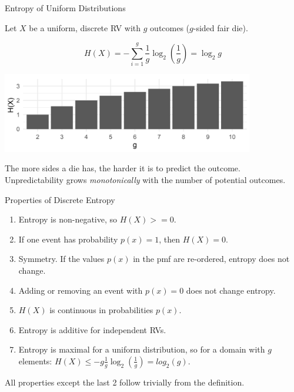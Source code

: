 \begin{vbframe}{Entropy of Uniform Distributions}

Let $X$ be a uniform, discrete RV with $g$ outcomes ($g$-sided fair die).

$$H(X) = - \sum_{i=1}^g \frac{1}{g} \log_2 \left(\frac{1}{g}\right) = \log_2 g$$

\vspace{0.2cm}
\begin{center}
\includegraphics[width = 11cm ]{figure_man/entropy-uniform.png} \\
\end{center}

The more sides a die has, the harder it is to predict the outcome. 
Unpredictability grows \textit{monotonically} with the number of potential outcomes.
\end{vbframe}

\begin{vbframe}{Properties of Discrete Entropy}
  \begin{enumerate}
    \item Entropy is non-negative, so $H(X) >= 0$.
    \item If one event has probability $p(x) = 1$, then $H(X)=0$. 
    \item Symmetry. If the values $p(x)$ in the pmf are re-ordered, entropy does not change.
    \item Adding or removing an event with $p(x)=0$ does not change entropy.
    \item $H(X)$ is continuous in probabilities $p(x)$.
    \item Entropy is additive for independent RVs.
    \item Entropy is maximal for a uniform distribution, so for a domain with $g$ elements:  
      $H(X) \leq -g\frac{1}{g} \log_2(\frac{1}{g}) = log_2(g)$.
  \end{enumerate}
\lz
All properties except the last 2 follow trivially from the definition.
\end{vbframe}


